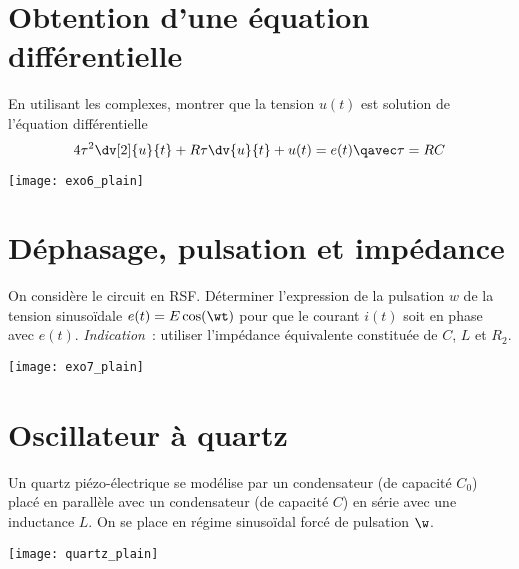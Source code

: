\documentclass[a4paper, 12pt, final, garamond]{book}
\begin{document}
\section{Obtention d'une équation différentielle}
\begin{minipage}{0.60\linewidth}
    En utilisant les complexes, montrer que la tension $u(t)$ est solution de
    l'équation différentielle
    \[4\tau^2 \dv[2]{u}{t} + R\tau \dv{u}{t} + u(t) = e(t)
        \qavec
        \tau = RC
    \]
\end{minipage}
\hfill
\begin{minipage}{0.35\linewidth}
    \begin{center}
        \texttt{[image: exo6\_plain]}
    \end{center}
\end{minipage}

\section{Déphasage, pulsation et impédance}
\begin{minipage}{0.55\linewidth}
    On considère le circuit en RSF. Déterminer l'expression de la pulsation $w$
    de la tension sinusoïdale $e(t) = E\cos(\wt)$ pour que le courant $i(t)$
    soit en phase avec $e(t)$. \bigbreak
    \textit{Indication}~: utiliser l'impédance équivalente constituée de $C$,
    $L$ et $R_2$.
\end{minipage}
\hfill
\begin{minipage}{0.40\linewidth}
    \begin{center}
        \texttt{[image: exo7\_plain]}
    \end{center}
\end{minipage}

\section{Oscillateur à quartz}
\begin{minipage}{0.60\linewidth}
    Un quartz piézo-électrique se modélise par un condensateur (de capacité
    $C_0$) placé en parallèle avec un condensateur (de capacité $C$) en série
    avec une inductance $L$. On se place en régime sinusoïdal forcé de pulsation
    $\w$.
\end{minipage}
\hfill
\begin{minipage}{0.35\linewidth}
    \begin{center}
        \texttt{[image: quartz\_plain]}
    \end{center}
\end{minipage}
\end{document}
